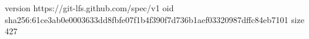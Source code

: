 version https://git-lfs.github.com/spec/v1
oid sha256:61ce3ab0e0003633dd8fbfe07f1b4f390f7d736b1aef03320987dffc84eb7101
size 427
